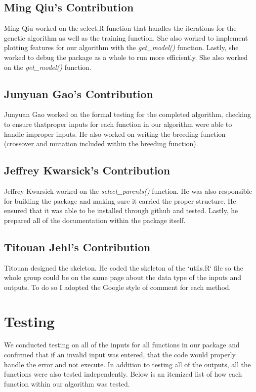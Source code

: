\documentclass{article}\usepackage[]{graphicx}\usepackage[]{color}
\begin{document}
\subsection{Ming Qiu's Contribution}
Ming Qiu worked on the select.R function that handles the iterations for the genetic algorithm as
well as the training function.  She also worked to implement plotting features for our algorithm with the \emph{get\_model()} function.  Lastly, she worked to debug the package as a whole to run more efficiently. She also worked on the \emph{get_model()} function.

\subsection{Junyuan Gao's Contribution}
Junyuan Gao worked on the formal testing for the completed algorithm, checking to ensure thatproper inputs for each function in our algorithm were able to handle improper inputs. He also worked on writing the breeding function (crossover and mutation included within the breeding function).

\subsection{Jeffrey Kwarsick's Contribution}
Jeffrey Kwarsick worked on the \emph{select\_parents()} function. He was also responsible for building
the package and making sure it carried the proper structure.  He ensured that it was able to be installed through github and tested.  Lastly, he prepared all of the documentation within the package itself.

\subsection{Titouan Jehl's Contribution}
Titouan designed the skeleton. He coded the skeleton of the ‘utils.R‘ file so the whole group could be on the same page about the data type of the inputs and outputs. To do so I adopted the Google style of comment for each method.

\section{Testing}
We conducted testing on all of the inputs for all functions in our package and confirmed that if an invalid input was entered, that the code would properly handle the error and not execute. In addition to testing all of the outputs, all the functions were also tested independently. Below is an itemized list of how each function within our algorithm was tested.
\end{document}
